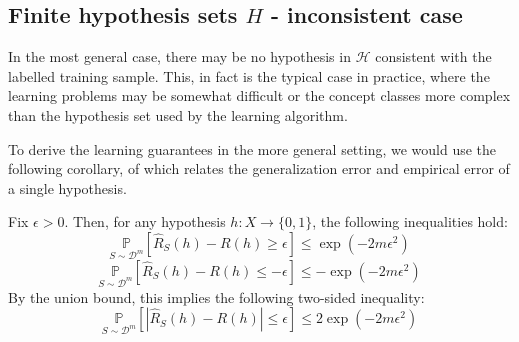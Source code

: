 \subsection{Finite hypothesis sets $H$ - inconsistent case}

In the most general case, there may be no hypothesis in $\mathcal{H}$ consistent with the labelled training sample. This, in fact is the typical case in practice, where the learning problems may be somewhat difficult or the concept classes more complex than the hypothesis set used by the learning algorithm. 

To derive the learning guarantees in the more general setting, we would use the following corollary, of which relates the generalization error and empirical error of a single hypothesis. 
\begin{col}
    Fix $\epsilon > 0$. Then, for any hypothesis $h: X \to \{0,1\}$, the following inequalities hold: 
    \begin{equation}
        \underset{S\sim \mathcal{D}^m}{\mathbb{P}} \left[\hat{R}_S (h) - R(h) \geq \epsilon\right] \leq \exp{(-2m\epsilon^2)}
    \end{equation}
    \begin{equation}
        \underset{S\sim \mathcal{D}^m}{\mathbb{P}} \left[\hat{R}_S (h) - R(h) \leq -\epsilon\right] \leq -\exp{(-2m\epsilon^2)}
    \end{equation}
    By the union bound, this implies the following two-sided inequality: 
    \begin{equation}
        \underset{S\sim \mathcal{D}^m}{\mathbb{P}} \left[|\hat{R}_S (h) - R(h)| \leq \epsilon\right] \leq 2\exp{(-2m\epsilon^2)}
    \end{equation}
\end{col}

